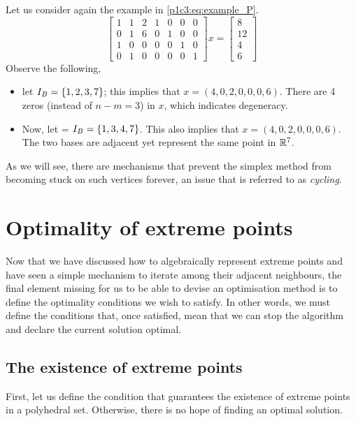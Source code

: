 Let us consider again the example in \eqref{p1c3:eq:example_P}. 
%
\begin{equation*}
	\begin{bmatrix}
		1 & 1 & 2 & 1 & 0 & 0 & 0 \\
		0 & 1 & 6 & 0 & 1 & 0 & 0 \\
		1 & 0 & 0 & 0 & 0 & 1 & 0 \\
		0 & 1 & 0 & 0 & 0 & 0 & 1
	\end{bmatrix} 
	x =
	\begin{bmatrix}
		8  \\
		12 \\
		4  \\
		6   	
	\end{bmatrix}
\end{equation*}
%
Observe the following, 
%
\begin{itemize}
	\item let $I_B = \left\{ 1,2,3,7 \right \}$; this implies that $x = (4,0,2,0,0,0,6)$. There are 4 zeros (instead of $n-m=3$) in $x$, which indicates degeneracy. 
	\item Now, let = $I_B = \left\{ 1,3,4,7 \right \}$. This also implies that $x = (4,0,2,0,0,0,6)$. The two bases are adjacent yet represent the same point in $\mathbb{R}^7$.	
\end{itemize}
%
As we will see, there are mechanisms that prevent the simplex method from becoming stuck on such vertices forever, an issue that is referred to as \emph{cycling}. 



\section{Optimality of extreme points}

Now that we have discussed how to algebraically represent extreme points and have seen a simple mechanism to iterate among their adjacent neighbours, the final element missing for us to be able to devise an optimisation method is to define the optimality conditions we wish to satisfy. In other words, we must define the conditions that, once satisfied, mean that we can stop the algorithm and declare the current solution optimal.


\subsection{The existence of extreme points}

First, let us define the condition that guarantees the existence of extreme points in a polyhedral set. Otherwise, there is no hope of finding an optimal solution.

